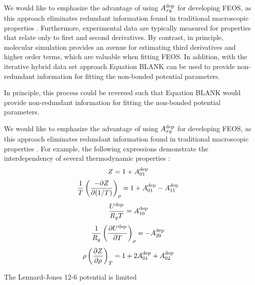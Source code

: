 \documentclass[11pt,a4paper]{article}
\begin{document}
We would like to emphasize the advantage of using $A_{xy}^{\rm dep}$ for developing FEOS, as this approach eliminates redundant information found in traditional macroscopic properties \cite{Thol2016_LJ,Rutkai2017,Lustig2015,Rutkai2013,Rutkai2015}. Furthermore, experimental data are typically measured for properties that relate only to first and second derivatives. By contrast, in principle, molecular simulation provides an avenue for estimating third derivatives and higher order terms, which are valuable when fitting FEOS. In addition, with the iterative hybrid data set approach Equation BLANK can be used to provide non-redundant information for fitting the non-bonded potential parameters. 
   
In principle, this process could be reversed such that Equation BLANK would provide non-redundant information for fitting the non-bonded potential parameters.
   
We would like to emphasize the advantage of using $A_{xy}^{\rm dep}$ for developing FEOS, as this approach eliminates redundant information found in traditional macroscopic properties \cite{Thol2016_LJ,Rutkai2017,Lustig2015,Rutkai2013,Rutkai2015}. For example, the following expressions demonstrate the interdependency of several thermodynamic properties \cite{Rutkai2015}:
\begin{equation} \label{eq:Z}
Z = 1 + A_{01}^{\rm dep}
\end{equation}
\begin{equation} \label{eq:Z_IC}
\frac{1}{T} \left(\frac{-\partial Z}{\partial(1/T)}\right)_\rho = 1 + A_{01}^{\rm dep} - A_{11}^{\rm dep}
\end{equation}
\begin{equation} \label{eq:U}
\frac{U^{\rm dep}}{R_gT} = A_{10}^{\rm dep}
\end{equation}
\begin{equation} \label{eq:U_IC}
\frac{1}{R_g} \left(\frac{\partial U^{\rm dep}}{\partial T}\right)_\rho = -A_{20}^{\rm dep} 
\end{equation} 
\begin{equation} \label{eq:Z_IT}
\rho \left(\frac{\partial Z}{\partial \rho}\right)_T = 1 + 2 A_{01}^{\rm dep} + A_{02}^{\rm dep} 
\end{equation}

The Lennard-Jones 12-6 potential is limited
\end{document}
